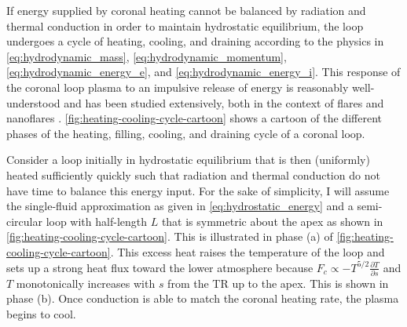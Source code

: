 If energy supplied by coronal heating cannot be balanced by radiation and thermal conduction in order to maintain hydrostatic equilibrium, the loop undergoes a cycle of heating, cooling, and draining according to the physics in \autoref{eq:hydrodynamic_mass}, \autoref{eq:hydrodynamic_momentum}, \autoref{eq:hydrodynamic_energy_e}, and \autoref{eq:hydrodynamic_energy_i}. This response of the coronal loop plasma to an impulsive release of energy is reasonably well-understood and has been studied extensively, both in the context of flares and nanoflares \citep[e.g.][]{antiochos_influence_1976,antiochos_evaporative_1978,cargill_implications_1994,cargill_cooling_1995,cargill_nanoflare_2004,bradshaw_cooling_2005,bradshaw_reinterpretation_2008,bradshaw_new_2010,bradshaw_cooling_2010}. \autoref{fig:heating-cooling-cycle-cartoon} shows a cartoon of the different phases of the heating, filling, cooling, and draining cycle of a coronal loop.

Consider a loop initially in hydrostatic equilibrium that is then (uniformly) heated sufficiently quickly such that radiation and thermal conduction do not have time to balance this energy input. For the sake of simplicity, I will assume the single-fluid approximation as given in \autoref{eq:hydrostatic_energy} and a semi-circular loop with half-length $L$ that is symmetric about the apex as shown in \autoref{fig:heating-cooling-cycle-cartoon}. This is illustrated in phase (a) of \autoref{fig:heating-cooling-cycle-cartoon}. This excess heat raises the temperature of the loop and sets up a strong heat flux toward the lower atmosphere because $F_c \propto -T^{5/2}\frac{\partial T}{\partial s}$ and $T$ monotonically increases with $s$ from the TR up to the apex. This is shown in phase (b). Once conduction is able to match the coronal heating rate, the plasma begins to cool.

